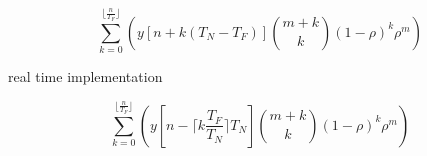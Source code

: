 \documentclass{sigchi}
\begin{document}
\begin{equation}
	\sum_{k=0}^{\lfloor \frac{n}{T_F} \rfloor}\left(y[n + k(T_N-T_F)]\binom{m+k}{k} (1 - \rho)^{k} \rho^m\right)
\end{equation}

real time implementation

\begin{equation}
	\sum_{k=0}^{\lfloor \frac{n}{T_F} \rfloor}\left(y[n - \lceil k\frac{T_F}{T_N}\rceil T_N] \binom{m+k}{k} (1 - \rho)^{k} \rho^m\right)
\end{equation}










\end{document}
